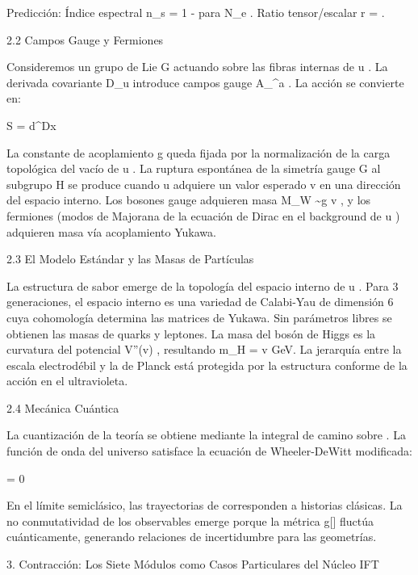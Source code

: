 \documentclass[12pt,a4paper]{book}
\begin{document}
Predicción: Índice espectral  n_s = 1 -    para  N_e  . Ratio tensor/escalar  r =   .

2.2 Campos Gauge y Fermiones

Consideremos un grupo de Lie  G  actuando sobre las fibras internas de  u . La derivada covariante  D_\mu u  introduce campos gauge  A_\mu^a . La acción se convierte en:

S = \int d^Dx  

La constante de acoplamiento  g  queda fijada por la normalización de la carga topológica del vacío de  u . La ruptura espontánea de la simetría gauge  G  al subgrupo  H  se produce cuando  u  adquiere un valor esperado  v  en una dirección del espacio interno. Los bosones gauge adquieren masa  M_W \sim g v , y los fermiones (modos de Majorana de la ecuación de Dirac en el background de  u ) adquieren masa vía acoplamiento Yukawa.

2.3 El Modelo Estándar y las Masas de Partículas

La estructura de sabor emerge de la topología del espacio interno de  u . Para 3 generaciones, el espacio interno es una variedad de Calabi-Yau de dimensión 6 cuya cohomología determina las matrices de Yukawa. Sin parámetros libres se obtienen las masas de quarks y leptones. La masa del bosón de Higgs es la curvatura del potencial  V''(v) , resultando  m_H = \sqrt{2\lambda}v   GeV. La jerarquía entre la escala electrodébil y la de Planck está protegida por la estructura conforme de la acción en el ultravioleta.

2.4 Mecánica Cuántica

La cuantización de la teoría se obtiene mediante la integral de camino sobre  \rho . La función de onda del universo  \Psi[\rho]  satisface la ecuación de Wheeler-DeWitt modificada:

 \Psi[\rho] = 0

En el límite semiclásico, las trayectorias de  \rho  corresponden a historias clásicas. La no conmutatividad de los observables emerge porque la métrica  g[\rho]  fluctúa cuánticamente, generando relaciones de incertidumbre para las geometrías.

3. Contracción: Los Siete Módulos como Casos Particulares del Núcleo IFT
\end{document}
